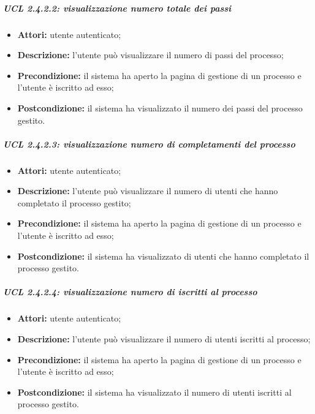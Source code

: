 \subparagraph{UCL 2.4.2.2: visualizzazione numero totale dei passi}
\begin{itemize}
\item \textbf{Attori:} utente autenticato;
\item \textbf{Descrizione:} l'utente può visualizzare il numero di passi del processo;
\item \textbf{Precondizione:} il sistema ha aperto la pagina di gestione di un processo e l'utente è iscritto ad esso;
\item \textbf{Postcondizione:} il sistema ha visualizzato il numero dei passi del processo gestito.
\end{itemize}

\subparagraph{UCL 2.4.2.3: visualizzazione numero di completamenti del processo}
\begin{itemize}
\item \textbf{Attori:} utente autenticato;
\item \textbf{Descrizione:} l'utente può visualizzare il numero di utenti che hanno completato il processo gestito;
\item \textbf{Precondizione:} il sistema ha aperto la pagina di gestione di un processo e l'utente è iscritto ad esso;
\item \textbf{Postcondizione:} il sistema ha visualizzato di utenti che hanno completato il processo gestito.
\end{itemize}

\subparagraph{UCL 2.4.2.4: visualizzazione numero di iscritti al processo}
\begin{itemize}
\item \textbf{Attori:} utente autenticato;
\item \textbf{Descrizione:} l'utente può visualizzare il numero di utenti iscritti al processo;
\item \textbf{Precondizione:} il sistema ha aperto la pagina di gestione di un processo e l'utente è iscritto ad esso;
\item \textbf{Postcondizione:} il sistema ha visualizzato il numero di utenti iscritti al processo gestito.
\end{itemize}

